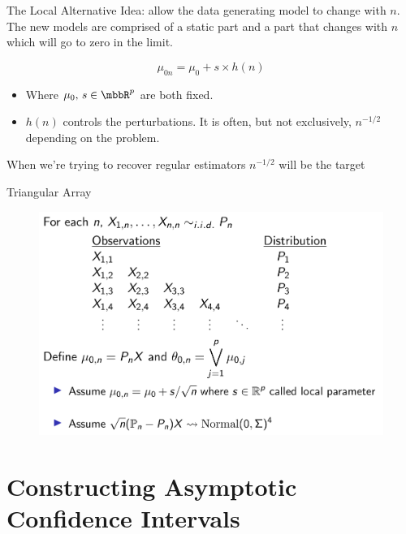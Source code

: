 \documentclass[aspectratio=169, professionalfonts]{beamer}
\begin{document}
\begin{frame}{The Local Alternative}
	Idea: allow the data generating model to change with $n$. The new models are
	comprised of a static part and a part that changes with $n$ which
	will go to zero in the limit.

	$$\mu_{0n} = \mu_0 + s \times h(n)$$
	\begin{itemize}
		\item Where $\mu_0, \,s \in \mbbR^{p}$ are both fixed.
		      \vfill
		\item $h(n)$ controls the perturbations. It is often, but not
		      exclusively, $n^{-1/2}$ depending on the problem.
	\end{itemize}
	\vfill

	When we're trying to recover regular estimators $n^{-1/2}$ will be the target

\end{frame}

\begin{frame}{Triangular Array}
	\begin{figure}
		\includegraphics[width=.85\textwidth]{figures/triangular-array}
	\end{figure}
\end{frame}

\section{Constructing Asymptotic Confidence Intervals}
\end{document}
